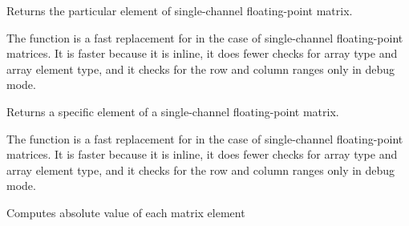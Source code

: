 Returns the particular element of single-channel floating-point matrix.


\begin{description}
\end{description}

The function is a fast replacement for 
in the case of single-channel floating-point matrices. It is faster because
it is inline, it does fewer checks for array type and array element type,
and it checks for the row and column ranges only in debug mode.

Returns a specific element of a single-channel floating-point matrix.


\begin{description}
\end{description}


The function is a fast replacement for 
in the case of single-channel floating-point matrices. It is faster because
it is inline, it does fewer checks for array type and array element type, 
and it checks for the row and column ranges only in debug mode.

\fi


\ifCpp

Computes absolute value of each matrix element


\begin{description}
\end{description}

